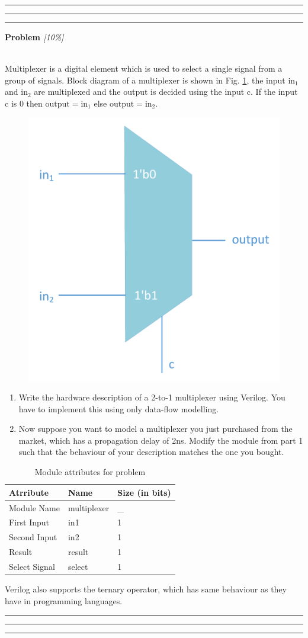 \documentclass[a4paper,10pt]{article}
\theoremstyle{mytheor}
\newcounter{problemNumber}
\newcommand {
  \insertProblem}[2]{
  \vspace{0.5cm}
  \hrule \hrule \hrule
  \vspace{0.3cm}
  
  {
    \setlength{\parindent}{0}

    {
      \color{greatblue}
      \textbf{\Large{Problem \theproblemNumber}}
      \hfill
      \textit{[#1]}
    }

  }

  \vspace{6pt}\\#2

  \addtocounter{problemNumber}{1}

  \vspace{0.2cm}
  \hrule \hrule \hrule
  \vspace{0.5cm}
}
\newcounter{hintCount} %
\newcommand{\hintcounter}[1]{%
  \refstepcounter{hintCount}%
  \thehintCount%
  \label{#1}}%
\newcounter{hintcnt}
\newcommand{\hint}[2] {
  \begin{tcolorbox}[colback=blue!5!white,colframe=blue!75!black,title=\textbf{Hint - \hintcounter{#1}}]  
    #2
  \end{tcolorbox}
  \addtocounter{hintcnt}{1}
}
\begin{document}
\insertProblem {10\%} { Multiplexer is a digital element which is used to
  select a single signal from a group of signals. Block diagram of a
  multiplexer is shown in Fig. \ref{multiplexer}, the input
  $\text{in}_1$ and $\text{in}_2$ are multiplexed and the output is
  decided using the input $\text{c}$. If the input c is 0 then
  $\text{output}=\text{in}_1$ else $\text{output}=\text{in}_2$.
  
  \begin{figure}[!h] \centering  
    \includegraphics[width=0.3\linewidth]{./resources/multiplexer.pdf} 
    \caption{} 
    \label{multiplexer} 
  \end{figure}

  \begin{enumerate}    
  \item Write the hardware description of a 2-to-1 multiplexer using
    Verilog. You have to implement this using only data-flow
    modelling.
  \item Now suppose you want to model a multiplexer you just purchased
    from the market, which has a propagation delay of 2ns. Modify the
    module from part 1 such that the behaviour of your description
    matches the one you bought.
    
  \end{enumerate}
    \begin{table}[!ht]
      \centering
      \caption{Module attributes for problem \theproblemNumber}
      \renewcommand{\arraystretch}{1.1}
      \begin{tabularx}{0.8\textwidth}{|X|X|X|}
        \hline
        \rowcolor{greatblue}
        \color{white} Atrribute & \color{white}Name & \color{white}Size (in bits) \\
        \hline
        Module Name   & multiplexer     & \_  \\
        First Input   & in1             &  1  \\
        Second Input  & in2             &  1  \\
        Result        & result          &  1  \\
        Select Signal & select          &  1  \\
        \hline
      \end{tabularx}
    \end{table}

    \hint{hint:problem-2}{Verilog also supports the ternary operator, which has same
      behaviour as they have in programming languages.}
}
\end{document}
